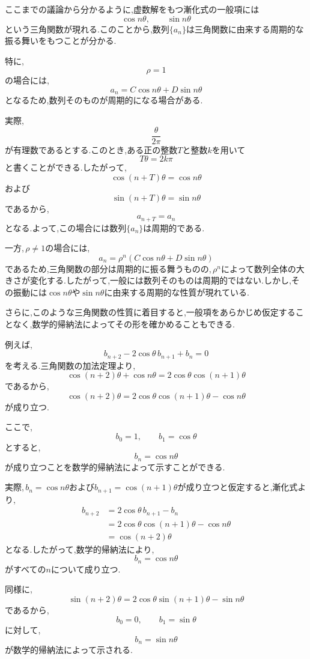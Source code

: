   ここまでの議論から分かるように,虚数解をもつ漸化式の一般項には
  \[
    \cos n\theta,\qquad \sin n\theta
  \]
  という三角関数が現れる.このことから,数列$\{a_n\}$は三角関数に由来する周期的な振る舞いをもつことが分かる.

  特に,
  \[
    \rho=1
  \]
  の場合には,
  \[
    a_n=C\cos n\theta+D\sin n\theta
  \]
  となるため,数列そのものが周期的になる場合がある.

  実際,
  \[
    \frac{\theta}{2\pi}
  \]
  が有理数であるとする.このとき,ある正の整数$T$と整数$k$を用いて
  \[
    T\theta=2k\pi
  \]
  と書くことができる.したがって,
  \[
    \cos(n+T)\theta=\cos n\theta
  \]
  および
  \[
    \sin(n+T)\theta=\sin n\theta
  \]
  であるから,
  \[
    a_{n+T}=a_n
  \]
  となる.よって,この場合には数列$\{a_n\}$は周期的である.

  一方,\,$\rho\neq1$の場合には,
  \[
    a_n=\rho^n
    (C\cos n\theta+D\sin n\theta)
  \]
  であるため,三角関数の部分は周期的に振る舞うものの,\,$\rho^n$によって数列全体の大きさが変化する.したがって,一般には数列そのものは周期的ではない.しかし,その振動には$\cos n\theta$や$\sin n\theta$に由来する周期的な性質が現れている.

  さらに,このような三角関数の性質に着目すると,一般項をあらかじめ仮定することなく,数学的帰納法によってその形を確かめることもできる.

  例えば,
  \[
    b_{n+2}-2\cos\theta\,b_{n+1}+b_n=0
  \]
  を考える.三角関数の加法定理より,
  \[
    \cos(n+2)\theta+\cos n\theta
    =2\cos\theta\cos(n+1)\theta
  \]
  であるから,
  \[
    \cos(n+2)\theta
    =2\cos\theta\cos(n+1)\theta-\cos n\theta
  \]
  が成り立つ.

  ここで,
  \[
    b_0=1,\qquad b_1=\cos\theta
  \]
  とすると,
  \[
    b_n=\cos n\theta
  \]
  が成り立つことを数学的帰納法によって示すことができる.

  実際,\,$b_n=\cos n\theta$および$b_{n+1}=\cos(n+1)\theta$が成り立つと仮定すると,漸化式より,
  \[
  \begin{aligned}
    b_{n+2}
    &=2\cos\theta\,b_{n+1}-b_n\\
    &=2\cos\theta\cos(n+1)\theta-\cos n\theta\\
    &=\cos(n+2)\theta
  \end{aligned}
  \]
  となる.したがって,数学的帰納法により,
  \[
    b_n=\cos n\theta
  \]
  がすべての$n$について成り立つ.

  同様に,
  \[
    \sin(n+2)\theta
    =2\cos\theta\sin(n+1)\theta-\sin n\theta
  \]
  であるから,
  \[
    b_0=0,\qquad b_1=\sin\theta
  \]
  に対して,
  \[
    b_n=\sin n\theta
  \]
  が数学的帰納法によって示される.

